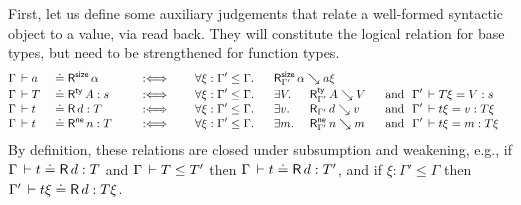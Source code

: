 \documentclass[acmsmall,screen]{acmart}\settopmatter{}
\newcommand{\LONGVERSION}[1]{}
\begin{document}
First, let us define some auxiliary judgements that relate a
well-formed syntactic object to a value, via read back.
They will constitute the logical relation for base types,
but need to be strengthened for function types.
\begin{alignat*}{8}
& \Gamma \der a && \doteq \tRsize\, \alpha
  && \quad\defas\quad
  && \forall \xi : \Gamma' \leq \Gamma.\ \
  && \mathrlap{ \RSize {\Gamma'} \alpha {a\xi} }
\\[-0.6ex]
& \Gamma \der T && \doteq \tRty\, A  : s
  && \quad\defas\quad
  && \forall \xi : \Gamma' \leq \Gamma.\ \
  && \exists V.\
  && \RTy{\Gamma'} A V
  && ~\mand~ \Gamma' \der T\xi = V : s
\\[-0.6ex]
& \Gamma \der t && \doteq \tR\, d  : T
  && \quad\defas\quad
  && \forall \xi : \Gamma' \leq \Gamma.\ \
  && \exists v.\
  && \R{\Gamma'} d v
  && ~\mand~ \Gamma' \der t\xi = v : T\xi
\\[-0.6ex]
& \Gamma \der t && \doteq \tRne\, n  : T
  && \quad\defas\quad
  && \forall \xi : \Gamma' \leq \Gamma.\ \
  && \exists m.\
  && \RNe{\Gamma'} n m
  && ~\mand~ \Gamma' \der t\xi = m : T\xi
\end{alignat*}
By definition, these relations are closed under subsumption and
weakening, e.g., if\/ $\Gamma \,\vdash t \doteq \mathsf{R}\, d : T$ and $\Gamma \,\vdash T \leq T'$ then $\Gamma \,\vdash t \doteq \mathsf{R}\, d : T'$,
and if\/ $\xi : \Gamma' \leq \Gamma$ then $\Gamma' \,\vdash t\xi \doteq \mathsf{R}\, d : T\xi$.
\LONGVERSION{
\begin{lemma}[Fresh variable readback]
  \label{lem:freshread}
  If\/ $\Gamma \der U$ then $\RNE{\cext \Gamma U} {\ind 0} {\var \Gamma} {U \slift}$.
\end{lemma}
\begin{proof}
  Assume $\xi : \Gamma' \leq \cext \Gamma U$.
  Note that $\RNe{\Gamma'} {\var\Gamma} {\ind i}$ where
  $i = |\Gamma'| - |\cext \Gamma U|$ is the length of the context extension.
  Since $\ind 0 \xi = \ind i$, we conclude
  $\Gamma' \der \ind 0 \xi = \ind i : U \slift \xi$
  by weakening of the judgement $\cext \Gamma U \der \ind 0 = \ind 0 : U \slift$.
\end{proof}
} %
\end{document}
